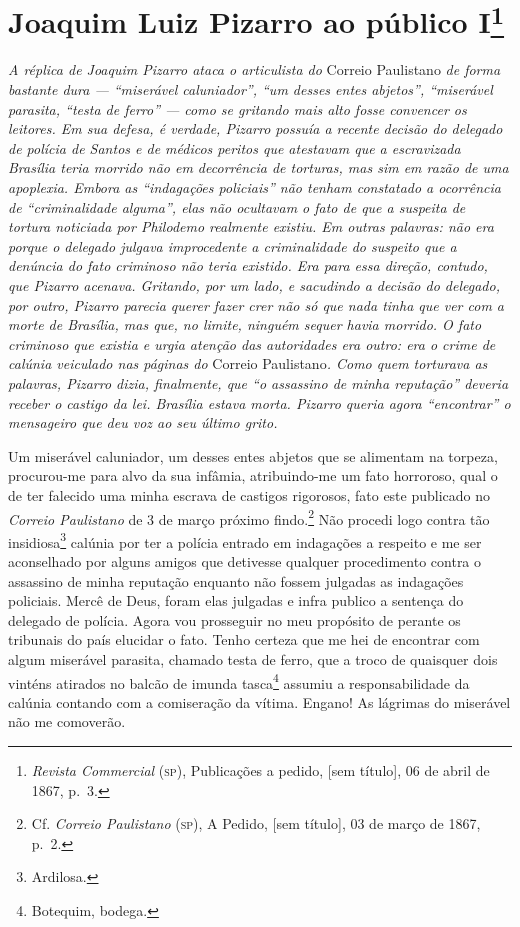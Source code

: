 \chapter{Joaquim Luiz Pizarro ao público I\footnote{\emph{Revista Commercial} (\textsc{sp}), Publicações a pedido, {[}sem título{]}, 06 de abril de 1867, p.~3.}}

\begin{didascalia}
\emph{A réplica de Joaquim Pizarro ataca o articulista do} Correio
Paulistano \emph{de forma bastante dura --- ``miserável caluniador'', ``um
desses entes abjetos'', ``miserável parasita, ``testa de ferro'' --- como se
gritando mais alto fosse convencer os leitores. Em sua defesa, é
verdade, Pizarro possuía a recente decisão do delegado de polícia de
Santos e de médicos peritos que atestavam que a escravizada Brasília
teria morrido não em decorrência de torturas, mas sim em razão de uma
apoplexia. Embora as ``indagações policiais'' não tenham constatado a
ocorrência de ``criminalidade alguma'', elas não ocultavam o fato de que a
suspeita de tortura noticiada por Philodemo realmente existiu. Em outras
palavras: não era porque o delegado julgava improcedente a criminalidade
do suspeito que a denúncia do fato criminoso não teria existido. Era
para essa direção, contudo, que Pizarro acenava. Gritando, por um lado,
e sacudindo a decisão do delegado, por outro, Pizarro parecia querer
fazer crer não só que nada tinha que ver com a morte de Brasília, mas
que, no limite, ninguém sequer havia morrido. O fato criminoso que
existia e urgia atenção das autoridades era outro: era o crime de
calúnia veiculado nas páginas do} Correio Paulistano\emph{. Como quem
torturava as palavras, Pizarro dizia, finalmente, que ``o assassino de
minha reputação'' deveria receber o castigo da lei. Brasília estava
morta. Pizarro queria agora ``encontrar'' o mensageiro que deu voz ao seu
último grito.}
\end{didascalia}



Um miserável caluniador, um desses entes abjetos que se alimentam na
torpeza, procurou-me para alvo da sua infâmia, atribuindo-me um fato
horroroso, qual o de ter falecido uma minha escrava de castigos
rigorosos, fato este publicado no \emph{Correio Paulistano} de 3 de
março próximo findo.\footnote{ Cf. \emph{Correio Paulistano} (\textsc{sp}), A
  Pedido, {[}sem título{]}, 03 de março de 1867, p.~2.} Não procedi logo contra
tão insidiosa\footnote{ Ardilosa.} calúnia por ter
a polícia entrado em indagações a respeito e me ser aconselhado por
alguns amigos que detivesse qualquer procedimento contra o assassino de
minha reputação enquanto não fossem julgadas as indagações policiais.
Mercê de Deus, foram elas julgadas e infra publico a sentença do
delegado de polícia. Agora vou prosseguir no meu propósito de perante os
tribunais do país elucidar o fato. Tenho certeza que me hei de encontrar
com algum miserável parasita, chamado testa de ferro, que a troco de
quaisquer dois vinténs atirados no balcão de imunda
tasca\footnote{ Botequim, bodega.} assumiu a
responsabilidade da calúnia contando com a comiseração da vítima.
Engano! As lágrimas do miserável não me comoverão.

